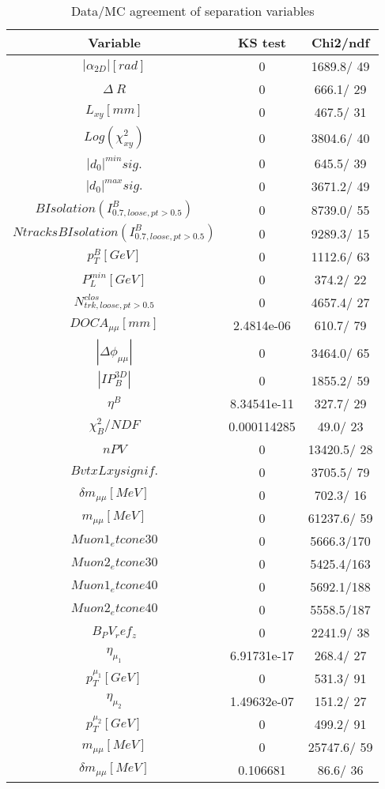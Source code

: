 \documentclass{article}
\begin{document}
\begin{table}[htbp]
\caption{\label{tab:sepVars}Data/MC agreement of separation variables}
\begin{center}
\begin{tabular}{c|c|c}
Variable & KS test & Chi2/ndf \\
\hline
$|\alpha_{2D}| [rad]$ & 0 & 1689.8/ 49\\
\hline
$\Delta~R$ & 0 & 666.1/ 29\\
\hline
$L_{xy} [mm]$ & 0 & 467.5/ 31\\
\hline
$Log(\chi^{2}_{xy})$ & 0 & 3804.6/ 40\\
\hline
$|d_{0}|^{min} sig.$ & 0 & 645.5/ 39\\
\hline
$|d_{0}|^{max} sig.$ & 0 & 3671.2/ 49\\
\hline
$B Isolation (I^{B}_{0.7, loose, pt>0.5})$ & 0 & 8739.0/ 55\\
\hline
$Ntracks B Isolation (I^{B}_{0.7, loose, pt>0.5})$ & 0 & 9289.3/ 15\\
\hline
$p_{T}^{B} [GeV]$ & 0 & 1112.6/ 63\\
\hline
$P^{min}_{L} [GeV]$ & 0 & 374.2/ 22\\
\hline
$N^{clos}_{trk, loose, pt>0.5}$ & 0 & 4657.4/ 27\\
\hline
$DOCA_{\mu\mu} [mm]$ & 2.4814e-06 & 610.7/ 79\\
\hline
$|\Delta\phi_{\mu\mu}|$ & 0 & 3464.0/ 65\\
\hline
$|IP_{B}^{3D}|$ & 0 & 1855.2/ 59\\
\hline
$\eta^{B}$ & 8.34541e-11 & 327.7/ 29\\
\hline
$\chi^{2}_{B}/NDF$ & 0.000114285 &  49.0/ 23\\
\hline
$nPV$ & 0 & 13420.5/ 28\\
\hline
$BvtxLxy signif.$ & 0 & 3705.5/ 79\\
\hline
$\delta m_{\mu\mu} [MeV]$ & 0 & 702.3/ 16\\
\hline
$m_{\mu\mu} [MeV]$ & 0 & 61237.6/ 59\\
\hline
$Muon1_etcone30$ & 0 & 5666.3/170\\
\hline
$Muon2_etcone30$ & 0 & 5425.4/163\\
\hline
$Muon1_etcone40$ & 0 & 5692.1/188\\
\hline
$Muon2_etcone40$ & 0 & 5558.5/187\\
\hline
$B_PV_ref_z$ & 0 & 2241.9/ 38\\
\hline
$\eta_{\mu_{1}}$ & 6.91731e-17 & 268.4/ 27\\
\hline
$p_{T}^{\mu_{1}} [GeV]$ & 0 & 531.3/ 91\\
\hline
$\eta_{\mu_{2}}$ & 1.49632e-07 & 151.2/ 27\\
\hline
$p_{T}^{\mu_{2}} [GeV]$ & 0 & 499.2/ 91\\
\hline
$m_{\mu\mu} [MeV]$ & 0 & 25747.6/ 59\\
\hline
$\delta m_{\mu\mu} [MeV]$ & 0.106681 &  86.6/ 36\\
\hline
\end{tabular}
\end{center}
\end{table}
\end{document}
